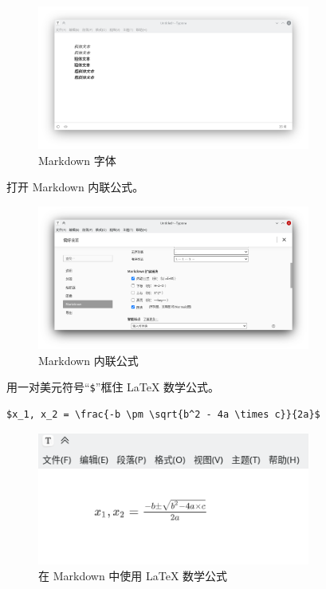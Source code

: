 \documentclass[UTF-8]{ctexart}
\begin{document}
				\begin{figure}[H]
					\centering
					\includegraphics[width=0.8\textwidth]{fig/markdown_font.png}
					\caption*{Markdown 字体}
				\end{figure}
			
				打开 Markdown 内联公式。
			
				\begin{figure}[H]
					\centering
					\includegraphics[width=0.8\textwidth]{fig/markdown_settings_math.png}
					\caption*{Markdown 内联公式}
				\end{figure}

				用一对美元符号“\texttt{\$}”框住 LaTeX 数学公式。
				
				\begin{verbatim}
$x_1, x_2 = \frac{-b \pm \sqrt{b^2 - 4a \times c}}{2a}$
				\end{verbatim}
			
				\begin{figure}[H]
					\centering
					\includegraphics[width=0.8\textwidth]{fig/markdown_math.png}
					\caption*{在 Markdown 中使用 LaTeX 数学公式}
				\end{figure}
				
\end{document}
